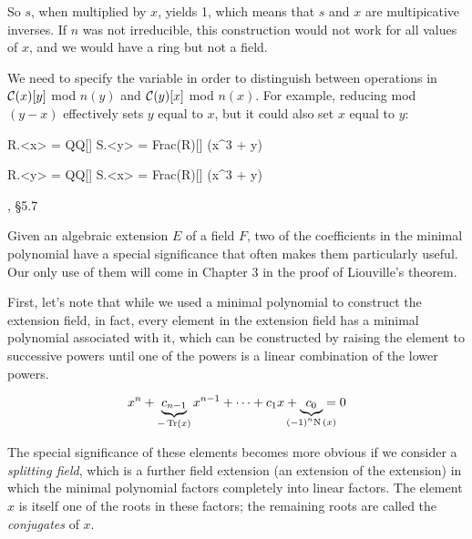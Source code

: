 So $s$, when multiplied by $x$, yields 1, which means
that $s$ and $x$ are multipicative inverses.
If $n$ was not irreducible, this construction would
not work for all values of $x$, and we would have
a ring but not a field.

We need to specify the variable in order to distinguish between
operations in ${\cal C}(x)[y]$ mod $n(y)$ and ${\cal C}(y)[x]$
mod $n(x)$.  For example, reducing mod $(y-x)$ effectively sets
$y$ equal to $x$, but it could also set $x$ equal to $y$:

\begin{sageblock}
R.<x> = QQ[]
S.<y> = Frac(R)[]
(x^3 + y) %
\end{sageblock}

\begin{sageblock}
R.<y> = QQ[]
S.<x> = Frac(R)[]
(x^3 + y) %
\end{sageblock}


\begin{comment}
Again, like with the fraction field, I tend to be a bit loose with the
notation.  Something like the Gaussian integers, which I wrote as
${\bf Z}[i]; i^2=-1$, really should be expressed as equivalence
classes modulo the polynomial $i^2+1$, i.e.  ${\bf Z}[i]/(i^2+1)$.
\end{comment}

\vfill\eject
{}
, \S5.7

Given an algebraic extension $E$ of a field $F$, two of the
coefficients in the minimal polynomial have a special significance
that often makes them particularly useful.  Our only use of them will
come in Chapter 3 in the proof of Liouville's theorem.

First, let's note that while we used a minimal polynomial to
construct the extension field,
in fact, every element in the extension field
has a minimal polynomial associated with it,
which can be constructed by raising the element to successive
powers until one of the powers is a linear combination
of the lower powers.

\begin{key point}
\huge
\begin{equation*}
x^n + \underbrace{c_{n-1}}_{- \Tr(x)} x^{n-1} + \cdots + c_1 x + \underbrace{c_0}_{\mathclap{(-1)^n \N(x)}} = 0
\end{equation*}
\end{key point}

The special significance of these elements becomes more obvious if we
consider a {\it splitting field}, which is a further field extension
(an extension of the extension) in which the minimal polynomial
factors completely into linear factors.  The element $x$ is
itself one of the roots in these factors; the remaining
roots are called the {\it conjugates} of $x$.


